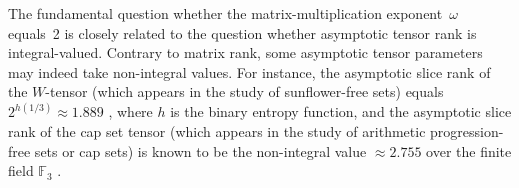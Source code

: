 \documentclass{daj}
\newcommand{\FF}{\mathbb{F}}
\begin{document}
The fundamental question whether the matrix-multiplication exponent~$\omega$ equals~2 is closely related to the question whether asymptotic tensor rank is integral-valued. Contrary to matrix rank, some asymptotic tensor parameters may indeed take non-integral values.
For instance, the asymptotic slice rank of the $W$-tensor (which appears in the study of sunflower-free sets) equals $2^{h(1/3)} \approx 1.889$ \cite{strassen1991degeneration}, %
where $h$ is the binary entropy function, and the asymptotic slice rank of the cap set tensor (which appears in the study of arithmetic progression-free sets or cap sets) is known to be the non-integral value $\approx 2.755$ over the finite field $\FF_3$ \cite{MR3583358, tao, kleinberg2018growth, strassen1991degeneration}. %
\end{document}
